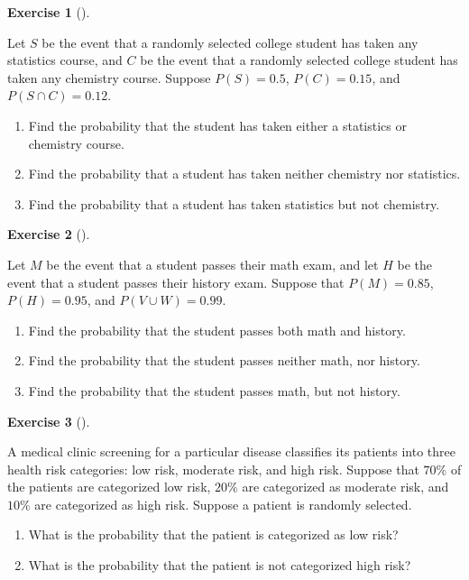 \documentclass[
  letterpaper,
  DIV=11,
  numbers=noendperiod]{scrreprt}
\providecommand{\tightlist}{%
  \setlength{\itemsep}{0pt}\setlength{\parskip}{0pt}}\usepackage{longtable,booktabs,array}
\theoremstyle{definition}
\theoremstyle{definition}
\newtheorem{exercise}{Exercise}[chapter]
\theoremstyle{definition}
\theoremstyle{remark}
\begin{document}
\begin{exercise}[]\protect\hypertarget{exr-3.5}{}\label{exr-3.5}

Let \(S\) be the event that a randomly selected college student has
taken any statistics course, and \(C\) be the event that a randomly
selected college student has taken any chemistry course. Suppose
\(P(S) = 0.5\), \(P(C) = 0.15\), and \(P(S\cap C) = 0.12\).

\begin{enumerate}
\def\labelenumi{\alph{enumi}.}
\tightlist
\item
  Find the probability that the student has taken either a statistics or
  chemistry course.
\item
  Find the probability that a student has taken neither chemistry nor
  statistics.
\item
  Find the probability that a student has taken statistics but not
  chemistry.
\end{enumerate}

\end{exercise}

\begin{exercise}[]\protect\hypertarget{exr-3.6}{}\label{exr-3.6}

Let \(M\) be the event that a student passes their math exam, and let
\(H\) be the event that a student passes their history exam. Suppose
that \(P(M) = 0.85\), \(P(H) = 0.95\), and \(P(V\cup W) = 0.99\).

\begin{enumerate}
\def\labelenumi{\alph{enumi}.}
\tightlist
\item
  Find the probability that the student passes both math and history.
\item
  Find the probability that the student passes neither math, nor
  history.
\item
  Find the probability that the student passes math, but not history.
\end{enumerate}

\end{exercise}

\begin{exercise}[]\protect\hypertarget{exr-3.7}{}\label{exr-3.7}

A medical clinic screening for a particular disease classifies its
patients into three health risk categories: low risk, moderate risk, and
high risk. Suppose that \(70\%\) of the patients are categorized low
risk, \(20\%\) are categorized as moderate risk, and \(10\%\) are
categorized as high risk. Suppose a patient is randomly selected.

\begin{enumerate}
\def\labelenumi{\alph{enumi}.}
\tightlist
\item
  What is the probability that the patient is categorized as low risk?
\item
  What is the probability that the patient is not categorized high risk?
\end{enumerate}

\end{exercise}
\end{document}

